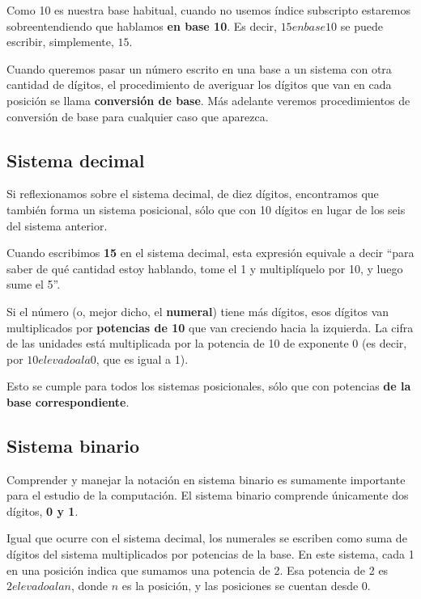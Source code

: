\documentclass[spanish,A4,]{article}
\begin{document}
Como 10 es nuestra base habitual, cuando no usemos índice subscripto
estaremos sobreentendiendo que hablamos \textbf{en base 10}. Es decir,
\textbf{$15 en base 10$} se puede escribir, simplemente, \textbf{$15$}.

Cuando queremos pasar un número escrito en una base a un sistema con
otra cantidad de dígitos, el procedimiento de averiguar los dígitos que
van en cada posición se llama \textbf{conversión de base}. Más adelante
veremos procedimientos de conversión de base para cualquier caso que
aparezca.

\subsection{Sistema decimal}\label{sistema-decimal}

Si reflexionamos sobre el sistema decimal, de diez dígitos, encontramos
que también forma un sistema posicional, sólo que con 10 dígitos en
lugar de los seis del sistema anterior.

Cuando escribimos \textbf{15} en el sistema decimal, esta expresión
equivale a decir ``para saber de qué cantidad estoy hablando, tome el 1
y multiplíquelo por 10, y luego sume el 5''.

Si el número (o, mejor dicho, el \textbf{numeral}) tiene más dígitos,
esos dígitos van multiplicados por \textbf{potencias de 10} que van
creciendo hacia la izquierda. La cifra de las unidades está multiplicada
por la potencia de 10 de exponente 0 (es decir, por $10 elevado a la 0$, que es igual
a 1).

Esto se cumple para todos los sistemas posicionales, sólo que con
potencias \textbf{de la base correspondiente}.

\subsection{Sistema binario}\label{sistema-binario}

Comprender y manejar la notación en sistema binario es sumamente
importante para el estudio de la computación. El sistema binario
comprende únicamente dos dígitos, \textbf{0 y 1}.

Igual que ocurre con el sistema decimal, los numerales se escriben como
suma de dígitos del sistema multiplicados por potencias de la base. En
este sistema, cada 1 en una posición indica que sumamos una potencia de
2. Esa potencia de 2 es $2 elevado a la n$, donde $n$ es la posición, y las
posiciones se cuentan desde 0.
\end{document}
